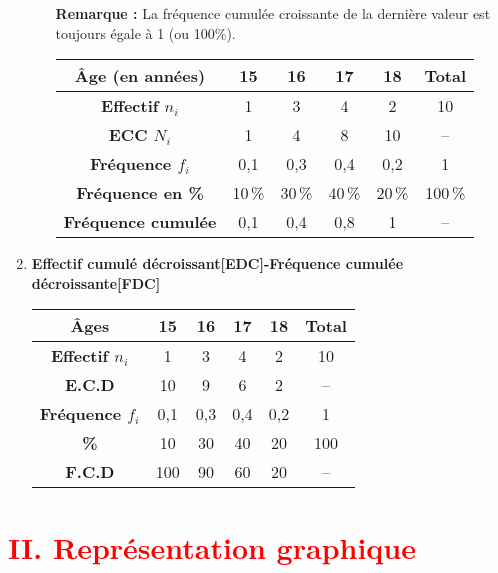 \documentclass[a4paper,12pt]{article}
\begin{document}
\begin{enumerate}[leftmargin=1.5cm, label=\textbf{\arabic*)}]
\begin{enumerate}
\vspace{0.3cm}
\begin{tcolorbox}[colback=blue!5!white, colframe=blue!60!black, boxrule=0.5pt]
\textbf{Remarque :} La fréquence cumulée croissante de la dernière valeur est toujours égale à 1 (ou 100\%).
\end{tcolorbox}

\begin{center}
\begin{tabular}{|c|c|c|c|c|c|}
    \hline
    \textbf{Âge (en années)} & 15 & 16 & 17 & 18 & \textbf{Total} \\
    \hline
    \textbf{Effectif \( n_i \)} & 1 & 3 & 4 & 2 & 10 \\
    \hline
    \textbf{ECC \( N_i \)} & 1 & 4 & 8 & 10 & -- \\
    \hline
    \textbf{Fréquence \( f_i \)} & 0{,}1 & 0{,}3 & 0{,}4 & 0{,}2 & 1 \\
    \hline
    \textbf{Fréquence en \%} & 10\,\% & 30\,\% & 40\,\% & 20\,\% & 100\,\% \\
    \hline
    \textbf{Fréquence cumulée} & 0{,}1 & 0{,}4 & 0{,}8 & 1 & -- \\
    \hline
\end{tabular}
\end{center}
\end{enumerate}

\item \textbf{Effectif cumulé décroissant[EDC]-Fréquence cumulée décroissante[FDC]}
\vspace{0.2cm}

\begin{center}
\begin{tabular}{|c|c|c|c|c|c|}
    \hline
    \textbf{Âges} & 15 & 16 & 17 & 18 & \textbf{Total} \\
    \hline
    \textbf{Effectif \( n_i \)} & 1 & 3 & 4 & 2 & 10 \\
    \hline
    \textbf{E.C.D} & 10 & 9 & 6 & 2 & -- \\
    \hline
    \textbf{Fréquence \( f_i \)} & 0{,}1 & 0{,}3 & 0{,}4 & 0{,}2 & 1 \\
    \hline
    \textbf{\%} & 10 & 30 & 40 & 20 & 100 \\
    \hline
    \textbf{F.C.D} & 100 & 90 & 60 & 20 & -- \\
    \hline
\end{tabular}
\end{center}
\end{enumerate}
\section*{\textcolor{red}{II. Représentation graphique}}
\end{document}
